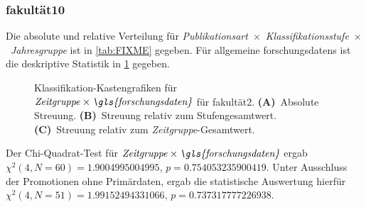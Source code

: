 \subsubsection{\gls{fakultät10}}
Die absolute und relative Verteilung für {\textit{Publikationsart}}~$\times$~{\textit{Klassifikationsstufe}}~$\times$~\textit{Jahresgruppe} ist in \cref{tab:FIXME} gegeben.
Für allgemeine \glspl{forschungsdaten} ist die deskriptive Statistik in \cref{fig:faculty_i_sampled_evaluated_adjusted_factors-only_Zeitgruppe_x_FD_absolute_boxplot} gegeben.
\begin{figure}[!htbp]
    \centering%
    \resizebox{.33\textwidth}{!}{}%
    \resizebox{.33\textwidth}{!}{}%
    \resizebox{.33\textwidth}{!}{}%
    \caption{Klassifikation-Kastengrafiken für $\text{\textit{Zeitgruppe}}\times\text{\textit{\gls{forschungsdaten}}}$ für \gls{fakultät2}. \textbf{(A)}~Absolute Streuung. \textbf{(B)}~Streuung relativ zum Stufengesamtwert. \textbf{(C)}~Streuung relativ zum \textit{Zeitgruppe}-Gesamtwert.}
    \label{fig:faculty_i_sampled_evaluated_adjusted_factors-only_Zeitgruppe_x_FD_absolute_boxplot}
\end{figure}
Der Chi-Quadrat-Test für $\text{\textit{Zeitgruppe}}\times\text{\textit{\gls{forschungsdaten}}}$ ergab $\chi^2 (\num{4}, N = \num{60}) = \num[round-mode=places,round-precision=3]{1.9004995004995}$, $p = \num[round-mode=places,round-precision=3]{0.754053235900419}$.
Unter Ausschluss der Promotionen ohne Primärdaten, ergab die statistische Auswertung hierfür $\chi^2 (\num{4}, N = \num{51}) = \num[round-mode=places,round-precision=3]{1.99152494331066}$, $p = \num[round-mode=places,round-precision=3]{0.737317777226938}$.

